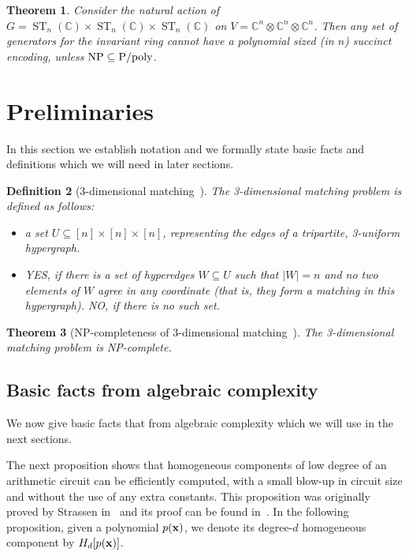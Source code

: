 \documentclass[10pt,a4paper]{article}
\newtheorem{theorem}{Theorem}
\newtheorem{definition}[theorem]{Definition}
\newcommand{\C}{\mathbb C}
\newcommand{\ST}{\operatorname{ST}}
\newcommand{\bx}{\textbf x}
\begin{document}
\begin{theorem}\label{thm:torus-action}
Consider the natural action of $G = \ST_n(\C) \times \ST_n(\C) \times \ST_n(\C)$ on $V = \C^n \otimes \C^n \otimes \C^n$. Then any set of generators for the invariant ring cannot have a polynomial sized (in $n$) succinct encoding, unless ${\rm NP \subseteq P/poly}$.
\end{theorem}

\setcounter{section}{1}
\section{Preliminaries}
\setcounter{theorem}{15}
%

In this section we establish notation and we formally state basic facts and definitions which
we will need in later sections.



\begin{definition}[3-dimensional matching~\cite{K72}]\label{def:3D-matching}
	The \emph{3-dimensional matching} problem is defined as follows:
	\begin{itemize}
		\item[Input:] a set $U \subseteq [n] \times [n] \times [n]$, representing the edges of
		a tripartite, 3-uniform hypergraph.
		\item[Output:] YES, if there is a set of hyperedges $W \subseteq U$ such that $|W| = n$ and
		no two elements of $W$ agree in any coordinate (that is, they form a matching in this
		hypergraph). NO, if there is no such set.
	\end{itemize}
\end{definition}

\begin{theorem}[NP-completeness of 3-dimensional matching~\cite{K72}]\label{thm:3D-matching-NP-complete}
	The 3-dimensional matching problem is NP-complete.
\end{theorem}

\subsection{Basic facts from algebraic complexity}

We now give basic facts that from algebraic complexity which we will use in the next sections.

The next proposition shows that homogeneous components of low degree
of an arithmetic circuit can be efficiently computed, with a small blow-up
in circuit size and without the use of any extra constants. This proposition was
originally proved by Strassen in~\cite{S73} and its proof can be found
in~\cite[Theorem 2.2]{SY10}.
In the following proposition, given a polynomial $p(\bx)$, we denote its degree-$d$ homogeneous component by $H_d[p(\bx)]$.
\end{document}
